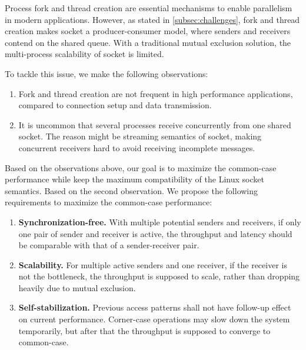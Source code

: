 Process fork and thread creation are essential mechanisms to enable parallelism in modern applications. 
However, as stated in \ref{subsec:challenges}, fork and thread creation makes socket a producer-consumer model, where senders and receivers contend on the shared queue. With a traditional mutual exclusion solution, the multi-process scalability of socket is limited.

To tackle this issue, we make the following observations:
\begin{enumerate}
	\item Fork and thread creation are not frequent in high performance applications, compared to connection setup and data transmission.
	\item It is uncommon that several processes receive concurrently from one shared socket. The reason might be streaming semantics of socket, making concurrent receivers hard to avoid receiving incomplete messages.
\end{enumerate}

Based on the observations above, our goal is to maximize the common-case performance while keep the maximum compatibility of the Linux socket semantics.
Based on the second observation. We propose the following requirements to maximize the common-case performance:
\begin{enumerate}
 \item \textbf{Synchronization-free.} With multiple potential senders and receivers, if only one pair of sender and receiver is active, the throughput and latency should be comparable with that of a sender-receiver pair.
 \item \textbf{Scalability.} For multiple active senders and one receiver, if the receiver is not the bottleneck, the throughput is supposed to scale, rather than dropping heavily due to mutual exclusion.
 \item \textbf{Self-stabilization.} Previous access patterns shall not have follow-up effect on current performance. Corner-case operations may slow down the system temporarily, but after that the throughput is supposed to converge to common-case.
\end{enumerate}

